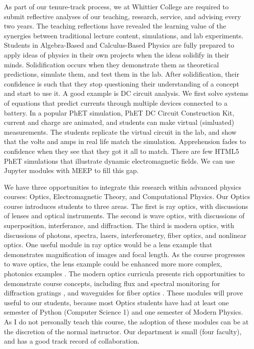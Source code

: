 \documentclass[../../main.tex]{subfiles}
\begin{document}
As part of our tenure-track process, we at Whittier College are required to submit reflective analyses of our teaching, research, service, and advising every two years.  The teaching reflections have revealed the learning value of the synergies between traditional lecture content, simulations, and lab experiments.  Students in Algebra-Based and Calculus-Based Physics are fully prepared to apply ideas of physics in their own projects when the ideas solidify in their minds.  Solidification occurs when they demonstrate them as theoretical predictions, simulate them, and test them in the lab.  After solidification, their confidence is such that they stop questioning their understanding of a concept and start to use it.  A good example is DC circuit analysis.  We first solve systems of equations that predict currents through multiple devices connected to a battery.  In a popular PhET simulation, PhET DC Circuit Construction Kit, current and charge are animated, and students can make virtual (simluated) measurements.  The students replicate the virtual circuit in the lab, and show that the volts and amps in real life match the simulation.  Apprehension fades to confidence when they see that they got it all to match.  There are few HTML5 PhET simulations that illustrate dynamic electromagnetic fields.  We can use Jupyter modules with MEEP to fill this gap. \\ \vspace{2.5mm}

We have three opportunities to integrate this research within advanced physics courses: Optics, Electromagnetic Theory, and Computational Physics.  Our Optics course introduces students to three areas.  The first is ray optics, with discussions of lenses and optical instruments.  The second is wave optics, with discussions of superposition, interferance, and diffraction. The third is modern optics, with discussions of photons, spectra, lasers, interferometry, fiber optics, and nonlinear optics.  One useful module in ray optics would be a lens example that demonstrates magnification of images and focal length.  As the course progresses to wave optics, the lens example could be enhanced more more complex, photonics examples \cite{meepcon2022_3}.  The modern optics curricula presents rich opportunities to demonstrate course concepts, including flux and spectral monitoring for diffraction gratings \cite{meepcon2022_4}, and waveguides for fiber optics \cite{meepcon2022_5}.  These modules will prove useful to our students, because most Optics students have had at least one semester of Python (Computer Science 1) and one semester of Modern Physics.  As I do not personally teach this course, the adoption of these modules can be at the discretion of the normal instructor.  Our department is small (four faculty), and has a good track record of collaboration.  \\ \vspace{2.5mm}
\end{document}
